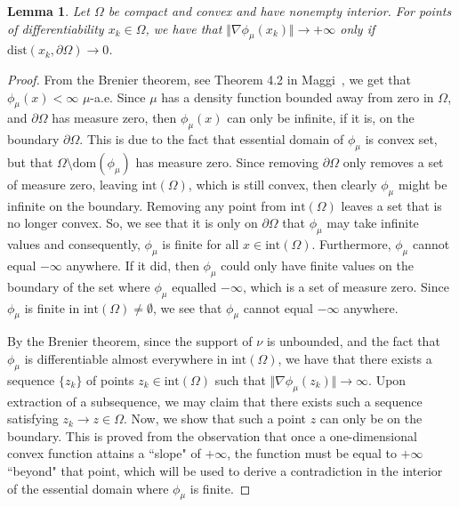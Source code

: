 \documentclass{amsart}
\theoremstyle{lemma}
\newtheorem{lemma}[theorem]{Lemma}
\theoremstyle{remark}
\begin{document}
\begin{lemma}\label{lemma:gradientexplosiononboundary}
Let $\Omega$ be compact and convex and have nonempty interior. For points of differentiability $x_k \in \Omega$, we have that $\Vert \nabla \phi_{\mu}(x_k) \Vert \rightarrow + \infty$ only if $\text{dist}(x_k, \partial \Omega) \rightarrow 0$.
\end{lemma}
\begin{proof}
From the Brenier theorem, see Theorem 4.2 in Maggi~\cite{maggi}, we get that $\phi_{\mu}(x) < \infty$ $\mu$-a.e. Since $\mu$ has a density function bounded away from zero in $\Omega$, and $\partial \Omega$ has measure zero, then $\phi_{\mu}(x)$ can only be infinite, if it is, on the boundary $\partial \Omega$. This is due to the fact that essential domain of $\phi_{\mu}$ is convex set, but that $\Omega \setminus \text{dom}(\phi_{\mu})$ has measure zero. Since removing $\partial \Omega$ only removes a set of measure zero, leaving $\text{int}(\Omega)$, which is still convex, then clearly $\phi_{\mu}$ might be infinite on the boundary. Removing any point from $\text{int}(\Omega)$ leaves a set that is no longer convex. So, we see that it is only on $\partial \Omega$ that $\phi_{\mu}$ may take infinite values and consequently, $\phi_{\mu}$ is finite for all $x \in \text{int}(\Omega)$. Furthermore, $\phi_{\mu}$ cannot equal $-\infty$ anywhere. If it did, then $\phi_{\mu}$ could only have finite values on the boundary of the set where $\phi_{\mu}$ equalled $-\infty$, which is a set of measure zero. Since $\phi_{\mu}$ is finite in $\text{int}(\Omega) \neq \emptyset$, we see that $\phi_{\mu}$ cannot equal $-\infty$ anywhere.


By the Brenier theorem, since the support of $\nu$ is unbounded, and the fact that $\phi_{\mu}$ is differentiable almost everywhere in $\text{int}(\Omega)$, we have that there exists a sequence $\{ z_k \}$ of points $z_k \in \text{int}(\Omega)$ such that $\Vert \nabla \phi_{\mu}(z_k) \Vert \rightarrow \infty$. Upon extraction of a subsequence, we may claim that there exists such a sequence satisfying $z_k \rightarrow z \in \Omega$. Now, we show that such a point $z$ can only be on the boundary. This is proved from the observation that once a one-dimensional convex function attains a ``slope" of $+\infty$, the function must be equal to $+\infty$ ``beyond" that point, which will be used to derive a contradiction in the interior of the essential domain where $\phi_{\mu}$ is finite.


\end{proof}
\end{document}
